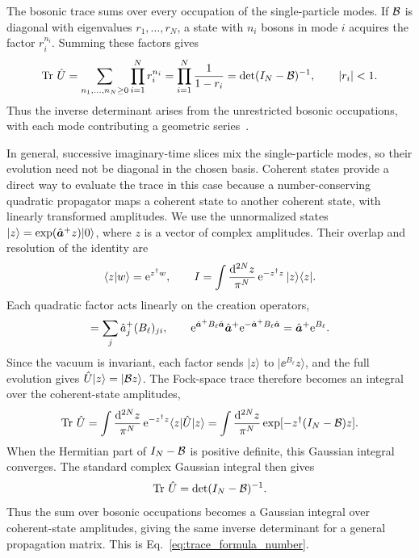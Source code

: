 The bosonic trace sums over every occupation of the single-particle modes. If $\mathcal{B}$ is diagonal with eigenvalues $r_1,\ldots,r_N$, a state with $n_i$ bosons in mode $i$ acquires the factor $r_i^{n_i}$. Summing these factors gives
\begin{equation}
    \operatorname{Tr}\,\hat U
    =
    \sum_{n_1,\ldots,n_N\ge0}\prod_{i=1}^{N}r_i^{n_i}
    =
    \prod_{i=1}^{N}\frac{1}{1-r_i}=\det(I_N-\mathcal{B})^{-1},
    \qquad |r_i|<1.
\end{equation}
Thus the inverse determinant arises from the unrestricted bosonic occupations, with each mode contributing a geometric series~\cite{Rubenstein2012PRA}.

In general, successive imaginary-time slices mix the single-particle modes, so their evolution need not be diagonal in the chosen basis. Coherent states provide a direct way to evaluate the trace in this case because a number-conserving quadratic propagator maps a coherent state to another coherent state, with linearly transformed amplitudes. We use the unnormalized states $|z\rangle=\exp(\hat{\bm{a}}^+z)|0\rangle$, where $z$ is a vector of complex amplitudes. Their overlap and resolution of the identity are
\begin{equation}
    \langle z|w\rangle=\mathrm{e}^{z^\dagger w},
    \qquad
    I=\int\frac{\mathrm{d}^{2N}z}{\pi^N}\,\mathrm{e}^{-z^\dagger z}\,|z\rangle\langle z|.
\end{equation}
Each quadratic factor acts linearly on the creation operators,
\begin{equation}
    [\hat{\bb a}^+B_\ell\hat{\bb a},\hat a_i^+]
    =\sum_j\hat a_j^+(B_\ell)_{ji},
    \qquad
    \ee^{\hat{\bb a}^+B_\ell\hat{\bb a}}\hat{\bb a}^+
    \ee^{-\hat{\bb a}^+B_\ell\hat{\bb a}}
    =\hat{\bb a}^+\ee^{B_\ell}.
\end{equation}
Since the vacuum is invariant, each factor sends $|z\rangle$ to $|\ee^{B_\ell}z\rangle$, and the full evolution gives $\hat U|z\rangle=|\mathcal{B} z\rangle$. The Fock-space trace therefore becomes an integral over the coherent-state amplitudes,
\begin{equation}
    \operatorname{Tr}\,\hat U
    =
    \int\frac{\mathrm{d}^{2N}z}{\pi^N}\,\mathrm{e}^{-z^\dagger z}
    \langle z|\hat U|z\rangle
    =
    \int\frac{\mathrm{d}^{2N}z}{\pi^N}
    \exp[-z^\dagger(I_N-\mathcal{B})z].
\end{equation}
When the Hermitian part of $I_N-\mathcal{B}$ is positive definite, this Gaussian integral converges. The standard complex Gaussian integral then gives
\begin{equation}
    \operatorname{Tr}\,\hat U=\det(I_N-\mathcal{B})^{-1}.
    \label{eq:number_trace_product}
\end{equation}
Thus the sum over bosonic occupations becomes a Gaussian integral over coherent-state amplitudes, giving the same inverse determinant for a general propagation matrix. This is Eq.~\eqref{eq:trace_formula_number}.

